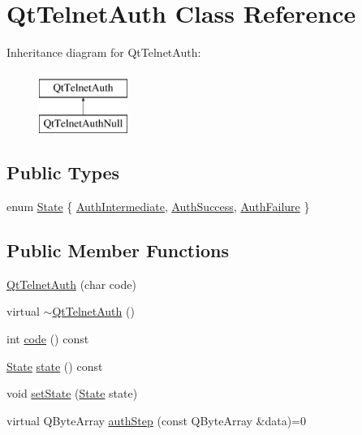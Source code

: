\hypertarget{classQtTelnetAuth}{
\section{QtTelnetAuth Class Reference}
\label{classQtTelnetAuth}
}
Inheritance diagram for QtTelnetAuth:\begin{figure}[H]
\begin{center}
\leavevmode
\includegraphics[height=2.000000cm]{classQtTelnetAuth}
\end{center}
\end{figure}
\subsection*{Public Types}
\begin{DoxyCompactItemize}
\item 
enum \hyperlink{classQtTelnetAuth_aef4fcfe1cf60491f566b31c7f8f8f2f2}{State} \{ \hyperlink{classQtTelnetAuth_aef4fcfe1cf60491f566b31c7f8f8f2f2ae72cd9a5978207fc7d62288158e389ef}{AuthIntermediate}, 
\hyperlink{classQtTelnetAuth_aef4fcfe1cf60491f566b31c7f8f8f2f2ae0795bd80ac1a018650ae5a13cb0720a}{AuthSuccess}, 
\hyperlink{classQtTelnetAuth_aef4fcfe1cf60491f566b31c7f8f8f2f2a31851366016c0a5fd364675c9a727def}{AuthFailure}
 \}
\end{DoxyCompactItemize}
\subsection*{Public Member Functions}
\begin{DoxyCompactItemize}
\item 
\hyperlink{classQtTelnetAuth_ae7d7ea247f07ff6c9890b9d4765a645a}{QtTelnetAuth} (char code)
\item 
virtual \hyperlink{classQtTelnetAuth_a9435d78fc604e59410dc36dc9334108d}{$\sim$QtTelnetAuth} ()
\item 
int \hyperlink{classQtTelnetAuth_a3d1b6069c3be43a9ced1906b8210e452}{code} () const 
\item 
\hyperlink{classQtTelnetAuth_aef4fcfe1cf60491f566b31c7f8f8f2f2}{State} \hyperlink{classQtTelnetAuth_a472cf022d3976da5abf78916b02ade7a}{state} () const 
\item 
void \hyperlink{classQtTelnetAuth_a89803c6612426beaaaf295528915f573}{setState} (\hyperlink{classQtTelnetAuth_aef4fcfe1cf60491f566b31c7f8f8f2f2}{State} state)
\item 
virtual QByteArray \hyperlink{classQtTelnetAuth_adceeb3a4fec9b58472d7cd7f2540e575}{authStep} (const QByteArray \&data)=0
\end{DoxyCompactItemize}
